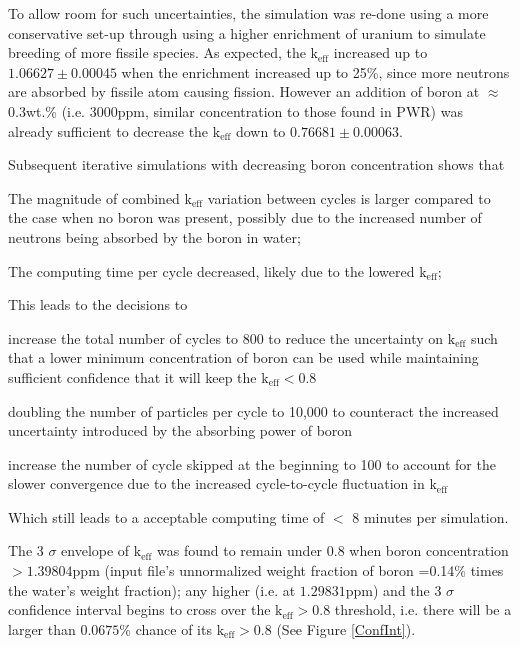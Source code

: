 \documentclass[a4paper, 12pt]{article}
\begin{document}
To allow room for such uncertainties, the simulation was re-done using a more conservative set-up through using a higher enrichment of uranium to simulate breeding of more fissile species.
As expected, the $\text{k}_{\text{eff}}$ increased up to $1.06627 \pm 0.00045$ when the enrichment increased up to 25\%, since more neutrons are absorbed by fissile atom causing fission. However an addition of boron at $\approx$ 0.3wt.\% (i.e. 3000ppm, similar concentration to those found in PWR) was already sufficient to decrease the $\text{k}_{\text{eff}}$ down to $0.76681 \pm 0.00063$.

Subsequent iterative simulations with decreasing boron concentration shows that
\begin{compactitem}\label{Ex3NumHist}
 	\item The magnitude of combined $\text{k}_{\text{eff}}$ variation between cycles is larger compared to the case when no boron was present, possibly due to the increased number of neutrons being absorbed by the boron in water;
	\item The computing time per cycle decreased, likely due to the lowered $\text{k}_{\text{eff}}$;
\end{compactitem} 
This leads to the decisions to 
\begin{compactitem}
	\item increase the total number of cycles to 800 to reduce the uncertainty on $\text{k}_{\text{eff}}$ such that a lower minimum concentration of boron can be used while maintaining sufficient confidence that it will keep the $\text{k}_{\text{eff}} < 0.8 $
	\item doubling the number of particles per cycle to 10,000 to counteract the increased uncertainty introduced by the absorbing power of boron
	\item increase the number of cycle skipped at the beginning to 100 to account for the slower convergence due to the increased cycle-to-cycle fluctuation in $\text{k}_{\text{eff}}$
\end{compactitem}
Which still leads to a acceptable computing time of $<$ 8 minutes per simulation.

The 3 $\sigma$ envelope of $\text{k}_{\text{eff}}$ was found to remain under 0.8 when boron concentration $>1.39804$ppm (input file's unnormalized weight fraction of boron =0.14\% times the water's weight fraction); any higher (i.e. at $1.29831$ppm) and the 3 $\sigma$ confidence interval begins to cross over the $\text{k}_{\text{eff}}>0.8$ threshold, i.e. there will be a larger than $0.0675 \%$ chance of its $\text{k}_{\text{eff}} >0.8$ (See Figure \ref{ConfInt}).
\end{document}
